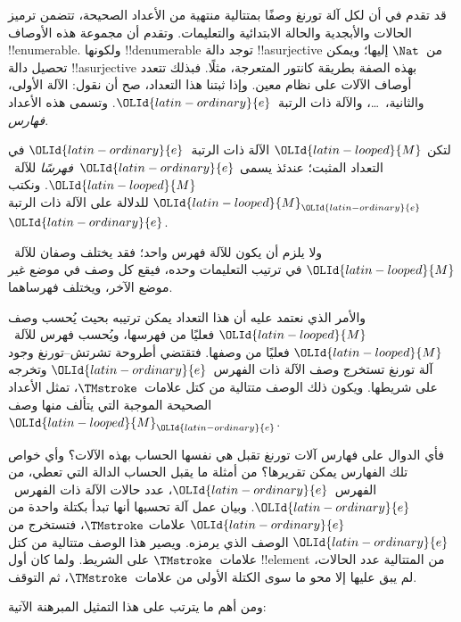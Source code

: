 \documentclass[../../../include/open-logic-section]{subfiles}
\begin{document}

قد تقدم في  أن لكل آلة تورنغ وصفًا بمتتالية
منتهية من الأعداد الصحيحة، تتضمن ترميز الحالات والأبجدية والحالة
الابتدائية والتعليمات. وتقدم أن مجموعة هذه الأوصاف !!{enumerable}.
ولكونها !!{denumerable} توجد دالة !!a{surjective} من~$\Nat$ إليها؛
ويمكن تحصيل دالة !!a{surjective} بهذه الصفة بطريقة كانتور المتعرجة،
مثلًا. فبذلك تتعدد أوصاف الآلات على نظام معين. وإذا ثبتنا هذا
التعداد، صح أن نقول: الآلة الأولى، والثانية،~\dots، والآلة ذات
الرتبة~$\OLId{latin-ordinary}{e}$. وتسمى هذه الأعداد \emph{فهارس}.

\begin{defn}
لتكن $\OLId{latin-looped}{M}$ الآلة ذات الرتبة~$\OLId{latin-ordinary}{e}$ في التعداد المثبت؛ عندئذ يسمى
$\OLId{latin-ordinary}{e}$~\emph{فهرسًا} للآلة~$\OLId{latin-looped}{M}$. ونكتب $\OLId{latin-looped}{M}_\OLId{latin-ordinary}{e}$ للدلالة على الآلة ذات
الرتبة~$\OLId{latin-ordinary}{e}$.
\end{defn}

ولا يلزم أن يكون للآلة فهرس واحد؛ فقد يختلف وصفان للآلة~$\OLId{latin-looped}{M}$
في ترتيب التعليمات وحده، فيقع كل وصف في موضع غير موضع الآخر،
ويختلف فهرساهما.

والأمر الذي نعتمد عليه أن هذا التعداد يمكن ترتيبه بحيث يُحسب وصف
$\OLId{latin-looped}{M}$ فعليًا من فهرسها، ويُحسب فهرس للآلة~$\OLId{latin-looped}{M}$ فعليًا من وصفها.
فتقتضي أطروحة تشرتش--تورنغ وجود آلة تورنغ تستخرج وصف الآلة ذات
الفهرس~$\OLId{latin-ordinary}{e}$ وتخرجه على شريطها. ويكون ذلك الوصف متتالية من كتل
علامات~$\TMstroke$، تمثل الأعداد الصحيحة الموجبة التي يتألف منها
وصف~$\OLId{latin-looped}{M}_\OLId{latin-ordinary}{e}$.

فأي الدوال على فهارس آلات تورنغ تقبل هي نفسها الحساب بهذه الآلات؟
وأي خواص تلك الفهارس يمكن تقريرها؟ من أمثلة ما يقبل الحساب الدالة
التي تعطي، من الفهرس~$\OLId{latin-ordinary}{e}$، عدد حالات الآلة ذات الفهرس~$\OLId{latin-ordinary}{e}$.
وبيان عمل آلة تحسبها أنها تبدأ بكتلة واحدة من $\OLId{latin-ordinary}{e}$ علامات
$\TMstroke$، فتستخرج من $\OLId{latin-ordinary}{e}$ الوصف الذي يرمزه. ويصير هذا الوصف
متتالية من كتل علامات~$\TMstroke$ على الشريط. ولما كان أول
!!{element} من المتتالية عدد الحالات، لم يبق عليها إلا محو ما سوى
الكتلة الأولى من علامات~$\TMstroke$، ثم التوقف.

ومن أهم ما يترتب على هذا التمثيل المبرهنة الآتية:
\end{document}
